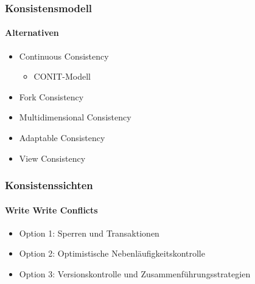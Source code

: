 \begin{frame}
  \frametitle{Konsistensmodell}
  \framesubtitle{Alternativen}
  \begin{itemize}
    \item Continuous Consistency 
    \begin{itemize}
      \item CONIT-Modell
    \end{itemize}
    \item Fork Consistency
    \item Multidimensional Consistency
    \item Adaptable Consistency
    \item View Consistency
  \end{itemize}
\end{frame}

\begin{frame}
  \frametitle{Konsistenssichten}
  \framesubtitle{Write Write Conflicts}
  \begin{itemize}
    \item Option 1: Sperren und Transaktionen
    \item Option 2: Optimistische Nebenläufigkeitskontrolle
    \item Option 3: Versionskontrolle und Zusammenführungsstrategien
  \end{itemize}
\end{frame}